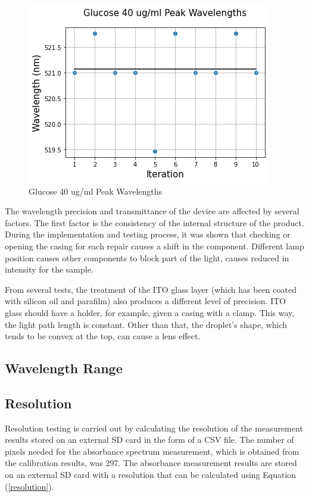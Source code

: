 \documentclass[conference]{IEEEtran}
\begin{document}
\begin{figure}[htbp]
    \centerline{\includegraphics[scale=0.5]{glucose_peakwavelength.png}}
    \caption{Glucose 40 ug/ml Peak Wavelengths}
    \label{glucose_peak_wavelength}
    \end{figure}

The wavelength precision and transmittance of the device are affected by several factors. 
The first factor is the consistency of the internal structure of the product.
During the implementation and testing process, it was shown that checking or opening the casing for each repair causes a shift in the component. 
Different lamp position causes other components to block part of the light, causes reduced in intensity for the sample.

From several tests, the treatment of the ITO glass layer (which has been coated with silicon oil and parafilm) also produces a different level of precision. 
ITO glass should have a holder, for example, given a casing with a clamp. 
This way, the light path length is constant. Other than that, the droplet's shape, which tends to be convex at the top, can cause a lens effect\cite{b3}.
    



\subsection{Wavelength Range}
\subsection{Resolution}
Resolution testing is carried out by calculating the resolution of the measurement results stored on an external SD card in the form of a CSV file.
The number of pixels needed for the absorbance spectrum measurement, which is obtained from the calibration results, was 297.
The absorbance measurement results are stored on an external SD card with a resolution that can be calculated using Equation (\ref{resolution}).
\end{document}
